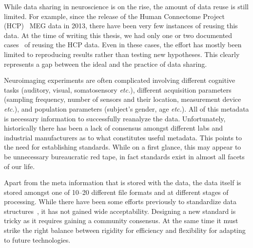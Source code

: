 While data sharing in neuroscience is on the rise, the amount of data reuse is still limited. For example, since the release of the Human Connectome Project (HCP)~\citep{larson2013adding} MEG data in 2013, there have been very few instances of reusing this data. At the time of writing this thesis, we had only one or two documented cases~\citep{jas2017autoreject} of reusing the HCP data. Even in these cases, the effort has mostly been limited to reproducing results rather than testing new hypotheses. This clearly represents a gap between the ideal and the practice of data sharing. 


Neuroimaging experiments are often complicated involving different  cognitive tasks (auditory, visual, somatosensory \emph{etc.}), different acquisition parameters (sampling frequency, number of sensors and their location, measurement device \emph{etc.}), and population parameters (subject's gender, age \emph{etc.}). All of this metadata is necessary information to successfully reanalyze the data. Unfortunately, historically there has been a lack of consensus amongst different labs and industrial manufacturers as to what constitutes useful metadata. This points to the need for establishing standards. While on a first glance, this may appear to be unnecessary bureaucratic red tape, in fact standards exist in almost all facets of our life. 

Apart from the meta information that is stored with the data, the data itself is stored amongst one of 10--20 different file formats and at different stages of processing. While there have been some efforts previously to standardize data structures~\citep{gibson2009minimum, grewe2011bottom, stoewer2013singlefile, teeters2015neurodata, bigdely2016preparing}, it has not gained wide acceptability. Designing a new standard is tricky as it requires gaining a community consensus. At the same time it must strike the right balance between rigidity for efficiency and flexibility for adapting to future technologies. 


